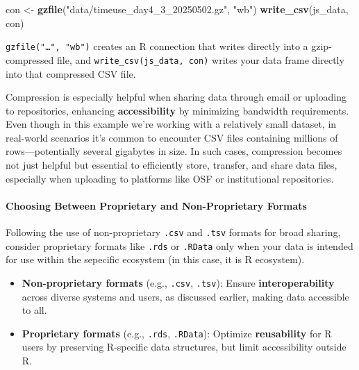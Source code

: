\documentclass[
]{article}
\newenvironment{Shaded}{\begin{snugshade}}{\end{snugshade}}
\newcommand{\FunctionTok}[1]{\textcolor[rgb]{0.13,0.29,0.53}{\textbf{#1}}}
\newcommand{\NormalTok}[1]{#1}
\newcommand{\OtherTok}[1]{\textcolor[rgb]{0.56,0.35,0.01}{#1}}
\newcommand{\StringTok}[1]{\textcolor[rgb]{0.31,0.60,0.02}{#1}}
\providecommand{\tightlist}{%
  \setlength{\itemsep}{0pt}\setlength{\parskip}{0pt}}
\begin{document}
\begin{Shaded}
\begin{Highlighting}[]
\NormalTok{con }\OtherTok{\textless{}{-}} \FunctionTok{gzfile}\NormalTok{(}\StringTok{"data/timeuse\_day4\_3\_20250502.gz"}\NormalTok{, }\StringTok{"wb"}\NormalTok{)}
\FunctionTok{write\_csv}\NormalTok{(js\_data, con)}
\end{Highlighting}
\end{Shaded}

\texttt{gzfile("…",\ "wb")} creates an R connection that writes directly
into a gzip-compressed file, and \texttt{write\_csv(js\_data,\ con)}
writes your data frame directly into that compressed CSV file.

Compression is especially helpful when sharing data through email or
uploading to repositories, enhancing \textbf{accessibility} by
minimizing bandwidth requirements. Even though in this example we're
working with a relatively small dataset, in real-world scenarios it's
common to encounter CSV files containing millions of rows---potentially
several gigabytes in size. In such cases, compression becomes not just
helpful but essential to efficiently store, transfer, and share data
files, especially when uploading to platforms like OSF or institutional
repositories.

\paragraph{Choosing Between Proprietary and Non-Proprietary
Formats}\label{choosing-between-proprietary-and-non-proprietary-formats}

Following the use of non-proprietary \texttt{.csv} and \texttt{.tsv}
formats for broad sharing, consider proprietary formats like
\texttt{.rds} or \texttt{.RData} only when your data is intended for use
within the sepecific ecosystem (in this case, it is R ecosystem).

\begin{itemize}
\tightlist
\item
  \textbf{Non-proprietary formats} (e.g., \texttt{.csv}, \texttt{.tsv}):
  Ensure \textbf{interoperability} across diverse systems and users, as
  discussed earlier, making data accessible to all.
\item
  \textbf{Proprietary formats} (e.g., \texttt{.rds}, \texttt{.RData}):
  Optimize \textbf{reusability} for R users by preserving R-specific
  data structures, but limit accessibility outside R.
\end{itemize}
\end{document}
